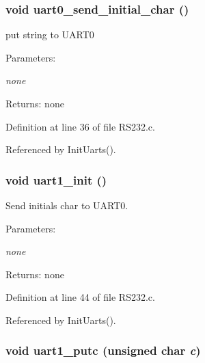 \subsubsection{\setlength{\rightskip}{0pt plus 5cm}void uart0\_\-send\_\-initial\_\-char ()}\label{_r_s232_8c_b0c760a24b8de71ee9b66479bf60ae9c}


put string to UART0 

\begin{Desc}
\item[Parameters:]
\begin{description}
\item[{\em none}]\end{description}
\end{Desc}
\begin{Desc}
\item[Returns:]none \end{Desc}


Definition at line 36 of file RS232.c.

Referenced by InitUarts().
\subsubsection{\setlength{\rightskip}{0pt plus 5cm}void uart1\_\-init ()}\label{_r_s232_8c_f59ed3d50cebafc783b6110df819ef40}


Send initials char to UART0. 

\begin{Desc}
\item[Parameters:]
\begin{description}
\item[{\em none}]\end{description}
\end{Desc}
\begin{Desc}
\item[Returns:]none \end{Desc}


Definition at line 44 of file RS232.c.

Referenced by InitUarts().
\subsubsection{\setlength{\rightskip}{0pt plus 5cm}void uart1\_\-putc (unsigned char {\em c})}\label{_r_s232_8c_e952b200b6a4d0d9e77daba1b63bd2da}



